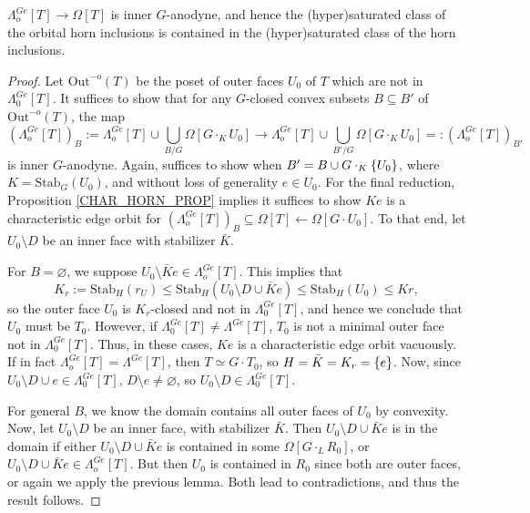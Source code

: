 \documentclass[a4paper,10pt,draft]{article}%
\numberwithin{equation}{section}%
\begin{document}
\begin{proposition}
      \label{ORB_HORN_PROP}
      $\Lambda_o^{Ge}[T] \to \Omega[T]$ is inner $G$-anodyne, and hence
      the (hyper)saturated class of the orbital horn inclusions is contained in
      the (hyper)saturated class of the horn inclusions.
\end{proposition}
\begin{proof}
      Let $\mathrm{Out}^{-o}(T)$ be the poset of outer faces $U_0$ of $T$ which are not in $\Lambda_0^{Ge}[T]$.
      It suffices to show that for any $G$-closed convex subsets $B \subseteq B'$ of $\mathrm{Out}^{-o}(T)$, the map
      \begin{equation}
            \left(\Lambda^{G e}_{o}[T]\right)_B
            := \Lambda_o^{Ge}[T] \cup \mathop{\bigcup}\limits_{B/G}\Omega[G \cdot_K U_0]
            \to
            \Lambda_o^{Ge}[T] \cup \mathop{\bigcup}\limits_{B'/G}\Omega[G \cdot_K U_0]
            =: (\Lambda^{G e}_o[T])_{B'}
      \end{equation}
      is inner $G$-anodyne.
      Again, suffices to show when $B' = B \cup G \cdot_K \left\{U_0\right\}$, where $K = \mathrm{Stab}_G(U_0)$, and
      without loss of generality $e \in U_0$.
      For the final reduction, Proposition \ref{CHAR_HORN_PROP} implies it suffices to show
      $K e$ is a characteristic edge orbit for
      $(\Lambda^{G e}_o[T])_B \subseteq \Omega[T] \leftarrow \Omega[G \cdot U_0]$.
      To that end, let $U_0 \setminus D$ be an inner face with stabilizer $\bar K$.
      
      For $B = \varnothing$, we suppose $U_0 \setminus \bar K e \in \Lambda_o^{G e}[T]$. This implies that
      \begin{equation}
            K_r := \mathrm{Stab}_H(r_U) \leq \mathrm{Stab}_H(U_0 \setminus D \cup \bar K e) \leq \mathrm{Stab}_H(U_0) \leq Kr,
      \end{equation}
      so the outer face $U_0$ is $K_r$-closed and not in $\Lambda_0^{Ge}[T]$, and hence we conclude that $U_0$ must be $T_0$.
      However, if $\Lambda^{Ge}_0[T] \neq \Lambda^{Ge}[T]$, $T_0$ is not a minimal outer face not in $\Lambda_0^{Ge}[T]$.
      Thus, in these cases, $K e$ is a characteristic edge orbit vacuously.
      If in fact $\Lambda_o^{Ge}[T] = \Lambda^{Ge}[T]$, then $T \simeq G \cdot T_0$, so $H = \bar K = K_r = \left\{e\right\}$.
      Now, since $U_0 \setminus D \cup e \in \Lambda_0^{Ge}[T]$,
      $D \setminus e \neq \varnothing$, so
      $U_0 \setminus D \in \Lambda_0^{Ge}[T]$.
      
      For general $B$, we know the domain contains all outer faces of $U_0$ by convexity.
      Now, let $U_0 \setminus D$ be an inner face, with stabilizer $\bar K$.
      Then $U_0 \setminus D \cup \bar K e$ is in the domain if either
      $U_0 \setminus D \cup \bar K e$ is contained in some $\Omega[G \cdot_L R_0]$, or
      $U_0 \setminus D \cup \bar K e \in \Lambda_o^{Ge}[T]$.
      But then $U_0$ is contained in $R_0$ since both are outer faces, or again we apply the previous lemma.
      Both lead to contradictions, and thus the result follows.
\end{proof}
\end{document}
